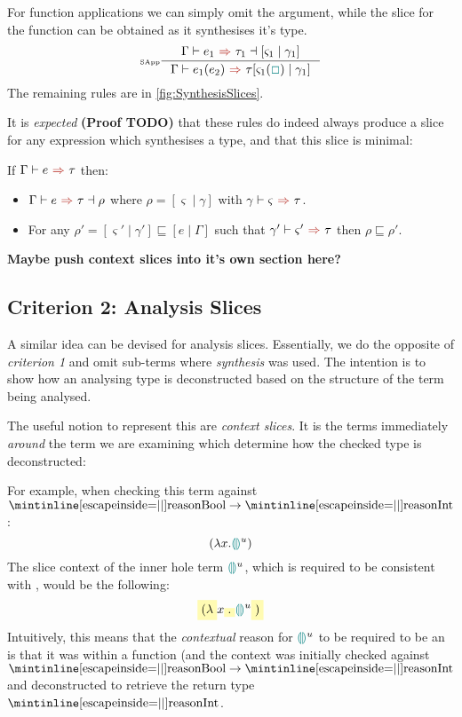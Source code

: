 For function applications we can simply omit the argument, while the slice for the function can be obtained as it synthesises it's type.
\[\inference[\tiny SApp]{\synthesisslice{e_1}{\tau_1}{[\varsigma_1 \mid \gamma_1]}}{\synthesis{e_1(e_2)}{\tau}{[\varsigma_1(\gap) \mid \gamma_1]}}\]
The remaining rules are in \cref{fig:SynthesisSlices}.

It is \textit{expected} \textbf{(Proof TODO)} that these rules do indeed always produce a slice for any expression which synthesises a type, and that this slice is minimal:
\begin{conjecture}[Correctness]
\label{conj:SynthesisSliceCorrectness}
If $\synthesis{e}{\tau}$ then:
\begin{itemize}
\item $\synthesisslice{e}{\tau}{\rho}$ where $\rho = [\varsigma \mid \gamma]$ with $\synthesis[\gamma]{\varsigma}{\tau}$.
\item For any $\rho' = [\varsigma' \mid \gamma'] \sqsubseteq [e\mid \Gamma]$ such that $\synthesis[\gamma']{\varsigma'}{\tau}$ then $\rho \sqsubseteq \rho'$.
\end{itemize}
\end{conjecture}

\textbf{Maybe push context slices into it's own section here?}

\subsection{Criterion 2: Analysis Slices}\label{sec:AnalysisSlices}
A similar idea can be devised for analysis slices. Essentially, we do the opposite of \textit{criterion 1} and omit sub-terms where \textit{synthesis} was used. The intention is to show how an analysing type is deconstructed based on the structure of the term being analysed. 

The useful notion to represent this are \textit{context slices}. It is the terms immediately \textit{around} the term we are examining which determine how the checked type is deconstructed:

For example, when checking this term against $\code{Bool} \to \code{Int}$:
\[(\lambda x. {\color{teal}\llparenthesis}  {\color{teal}\rrparenthesis}^u)\]
The slice context of the inner hole term ${\color{teal}\llparenthesis}  {\color{teal}\rrparenthesis}^u$, which is required to be consistent with , would be the following:
\[\hlcmaths[yellow!30]{(\lambda} x\hlcmaths[yellow!30]{.} \hole^u \hlcmaths[yellow!30]{)}\]
Intuitively, this means that the \textit{contextual} reason for ${\color{teal}\llparenthesis}  {\color{teal}\rrparenthesis}^u$ to be required to be an  is that it was within a function (and the context was initially checked against $\code{Bool} \to \code{Int}$ and deconstructed to retrieve the return type $\code{Int}$.

